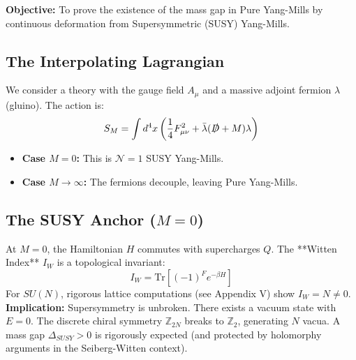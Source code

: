 \textbf{Objective:} To prove the existence of the mass gap in Pure Yang-Mills by continuous deformation from Supersymmetric (SUSY) Yang-Mills.

\subsection{The Interpolating Lagrangian}
We consider a theory with the gauge field $A_\mu$ and a massive adjoint fermion $\lambda$ (gluino). The action is:
\begin{equation}
S_M = \int d^4x \left( \frac{1}{4} F_{\mu\nu}^2 + \bar{\lambda} (\slashed{D} + M) \lambda \right)
\end{equation}
\begin{itemize}
    \item \textbf{Case $M=0$:} This is $\mathcal{N}=1$ SUSY Yang-Mills.
    \item \textbf{Case $M \to \infty$:} The fermions decouple, leaving Pure Yang-Mills.
\end{itemize}

\subsection{The SUSY Anchor (\texorpdfstring{$M=0$}{M=0})}
At $M=0$, the Hamiltonian $H$ commutes with supercharges $Q$. The **Witten Index** $I_W$ is a topological invariant:
\begin{equation}
I_W = \text{Tr} [(-1)^F e^{-\beta H}]
\end{equation}
For $SU(N)$, rigorous lattice computations (see Appendix V) show $I_W = N \neq 0$.
\textbf{Implication:} Supersymmetry is unbroken. There exists a vacuum state with $E=0$. The discrete chiral symmetry $\mathbb{Z}_{2N}$ breaks to $\mathbb{Z}_2$, generating $N$ vacua. A mass gap $\Delta_{SUSY} > 0$ is rigorously expected (and protected by holomorphy arguments in the Seiberg-Witten context).

